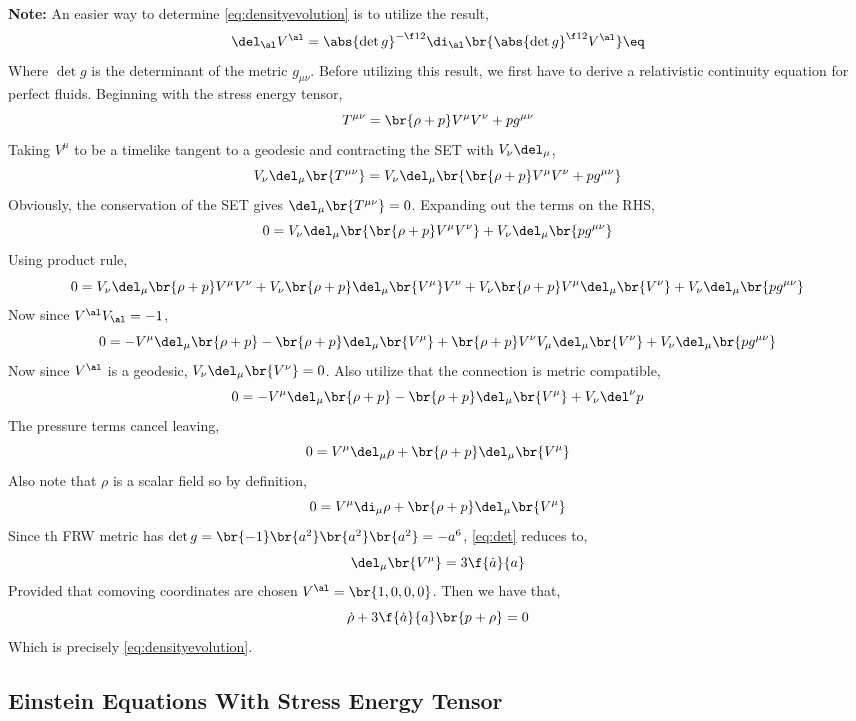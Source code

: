 \documentclass{article}
\begin{document}
\textbf{Note:} An easier way to determine \eqref{eq:densityevolution} is to utilize the result,
\[ \del_\al V^\al = \abs{\det g}^{-\f12} \di_\al \br{\abs{\det g}^{\f12} V^\al} \eq \label{eq:det} \]
Where $\det g$ is the determinant of the metric $g_{\mu\nu}$. Before utilizing this result, we first have to derive a relativistic continuity equation for perfect fluids. Beginning with the stress energy tensor,
\[ T^{\mu\nu} = \br{\rho + p}V^\mu V^\nu + p g^{\mu\nu}\]
Taking $V^\mu$ to be a timelike tangent to a geodesic and contracting the SET with $V_\nu \del_\mu$,
\[ V_\nu \del_\mu\br{T^{\mu\nu}} = V_\nu \del_\mu\br{\br{\rho + p}V^\mu V^\nu + p g^{\mu\nu}} \]
Obviously, the conservation of the SET gives $\del_\mu\br{T^{\mu\nu}} = 0$. Expanding out the terms on the RHS,
\[ 0 = V_\nu \del_\mu\br{\br{\rho + p}V^\mu V^\nu} + V_\nu \del_\mu\br{p g^{\mu\nu}} \]
Using product rule,
\[ 0 = V_\nu \del_\mu\br{\rho + p}V^\mu V^\nu + V_\nu \br{\rho + p}\del_\mu\br{V^\mu} V^\nu + V_\nu \br{\rho + p}V^\mu \del_\mu\br{V^\nu} + V_\nu \del_\mu\br{p g^{\mu\nu}} \]
Now since $V^\al V_{\al} = -1$,
\[ 0 = -V^\mu\del_\mu\br{\rho + p} - \br{\rho + p}\del_\mu\br{V^\mu} + \br{\rho + p}V^\nu V_\mu \del_\mu\br{V^\nu} + V_\nu \del_\mu\br{p g^{\mu\nu}} \]
Now since $V^\al$ is a geodesic, $V_\nu \del_\mu\br{V^\nu} = 0$. Also utilize that the connection is metric compatible,
\[ 0 = -V^\mu\del_\mu\br{\rho + p} - \br{\rho + p}\del_\mu\br{V^\mu} + V_\nu \del^\nu p \]
The pressure terms cancel leaving,
\[ 0 = V^\mu\del_\mu \rho + \br{\rho + p}\del_\mu\br{V^\mu} \]
Also note that $\rho$ is a scalar field so by definition,
\[ 0 = V^\mu\di_\mu \rho + \br{\rho + p}\del_\mu\br{V^\mu} \]
Since th FRW metric has $\det g = \br{-1}\br{a^2}\br{a^2}\br{a^2} = - a^6$, \eqref{eq:det} reduces to,
\[ \del_\mu\br{V^\mu} = 3 \f{\dot{a}}{a} \]
Provided that comoving coordinates are chosen $V^\al = \br{1,0,0,0}$. Then we have that,
\[ \dot{\rho} + 3 \f{\dot{a}}{a}\br{p + \rho} = 0 \]
Which is precisely \eqref{eq:densityevolution}.
\subsection{Einstein Equations With Stress Energy Tensor}
\end{document}
